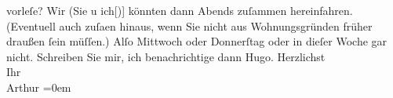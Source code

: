 \begin{ledgroupsized}[t]{13cm}
{                  vorleſe}{}\label{K_L01188_1h}? Wir (Sie u ich{[}){]}{ }{\pb}könnten dann Abends zuſammen
               hereinfahren. (Eventuell auch zuſa{\geminationm}en hinaus, wenn Sie
               nicht aus Wohnungsgründen früher draußen ſein müſſen.)\pend
           \pstart
           Alſo Mittwoch oder Donnerſtag oder in dieſer Woche gar
               nicht.\pend
           \pstart
           {\pb}Schreiben Sie mir, ich benachrichtige dann Hugo.\pend
           \pstart
           Herzlichst{\\[\baselineskip]}Ihr{\\[\baselineskip]}\spacefill\mbox{Arthur}\pend
           \leftskip=0em{}          \endnumbering{}\end{ledgroupsized}  \newcommand{\dateiname}{L01188}\newcommand{\titel}{Arthur Schnitzler an Richard Beer-Hofmann, 25. 11. 1901}\newcommand{\editorInnen}{Martin Anton Müller und Gerd-Hermann Susen}
            \footnotesize
\begin{ledgroupsized}[t]{11.5cm}
\end{ledgroupsized}
         
      